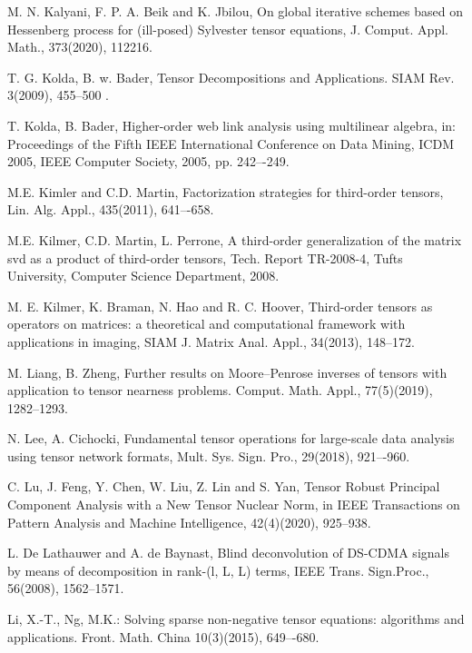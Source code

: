 \documentclass{siamltex}
\newcommand{\1}{\mathbb{1}}
\newcommand{\0}{\mathbb{0}}
\begin{document}
\begin{thebibliography}{99}
		M. N. Kalyani, F. P.  A. Beik and K. Jbilou, On global iterative schemes based on Hessenberg process for (ill-posed) Sylvester tensor equations, J. Comput. Appl. Math., 373(2020), 112216.
		
		
		T. G. Kolda, B. w. Bader, Tensor Decompositions and Applications. SIAM Rev.  3(2009), 455--500 .
		
		T. Kolda, B. Bader, Higher-order web link analysis using multilinear algebra, in: Proceedings of the Fifth IEEE International
		Conference on Data Mining, ICDM 2005, IEEE Computer Society, 2005, pp. 242–-249.
		
		M.E. Kimler and C.D. Martin, Factorization strategies for third-order tensors,  Lin. Alg. Appl., 435(2011), 641–-658.
		
		M.E. Kilmer, C.D. Martin, L. Perrone, A third-order generalization of the matrix svd as a product of third-order tensors, Tech.
		Report TR-2008-4, Tufts University, Computer Science Department, 2008.
		
		M. E. Kilmer, K. Braman, N. Hao and R. C. Hoover, Third-order tensors as operators
		on matrices: a theoretical and computational framework with applications in imaging,
		SIAM J. Matrix Anal. Appl., 34(2013), 148--172.
		
		
		M. Liang, B. Zheng, 
		Further results on Moore–Penrose inverses of tensors with application to tensor nearness problems.    Comput. Math.  Appl., 
		77(5)(2019), 1282--1293.
		
		
		N. Lee, A. Cichocki, Fundamental tensor operations for large-scale data analysis using tensor network formats, Mult. Sys. Sign. Pro., 29(2018), 921–-960.
		
		
		C. Lu, J. Feng, Y. Chen, W. Liu, Z. Lin and S. Yan, Tensor Robust Principal Component Analysis with a New Tensor Nuclear Norm, in IEEE Transactions on Pattern Analysis and Machine Intelligence, 42(4)(2020),  925--938.
		
		
		
		L. De Lathauwer and A. de Baynast, Blind deconvolution of DS-CDMA signals by means of decomposition in rank-(l, L, L) terms, IEEE Trans. Sign.Proc., 56(2008),  1562--1571.
		
		Li, X.-T., Ng, M.K.: Solving sparse non-negative tensor equations: algorithms and   applications. Front. Math. China 10(3)(2015), 649–-680.
		

\end{thebibliography}
\end{document}
